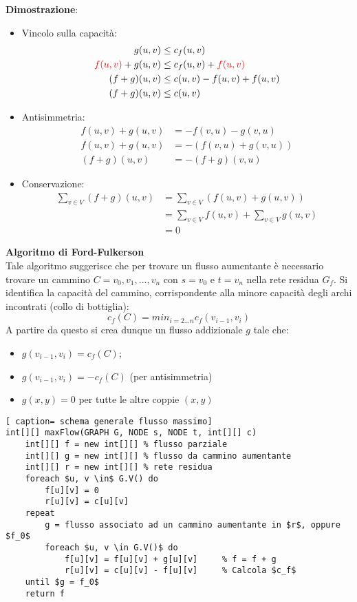 \documentclass[../cheatSheetAlgoritmi.tex]{subfiles}
\begin{document}
\textbf{Dimostrazione}:
\begin{itemize}
	\item Vincolo sulla capacità:
		\begin{align*}
		g(u, v) & \leq c_f(u, v) \\
		\textcolor{red}{f(u, v)} + g(u, v) & \leq c_f(u, v) + \textcolor{red}{f(u, v)} \\
		(f + g)(u, v) & \leq c(u, v) - f(u, v) + f(u, v) \\
		(f + g)(u, v) & \leq c(u, v)
		\end{align*}
	\item Antisimmetria:
		\begin{align*}
		f(u, v) + g(u, v) & = -f(v, u) - g(v, u) \\
		f(u, v) + g(u, v) & = -(f(v, u) + g(v, u)) \\
		(f+g)(u, v) & = - (f + g)(v, u)
		\end{align*}
	\item Conservazione:
		\begin{align*}
		\sum_{v \in V}(f + g)(u, v) & = 	\sum_{v \in V}(f(u, v) + g(u, v)) \\
		& = \sum_{v \in V}f(u, v) +  \sum_{v \in V}g(u, v)\\
		& = 0
		\end{align*}
\end{itemize}
\textbf{Algoritmo di Ford-Fulkerson} \\
Tale algoritmo suggerisce che per trovare un flusso aumentante è necessario trovare un cammino $C = v_0, v_1, ..., v_n$ con $s = v_0$ e $t = v_n$ nella rete residua $G_f$.
Si identifica la capacità del cammino, corrispondente alla minore capacità degli archi incontrati (collo di bottiglia):
\begin{equation*}
  	c_f(C) = min_{i = 2...n} c_f(v_{i-1}, v_i)
\end{equation*}
A partire da questo si crea dunque un flusso addizionale $g$ tale che:
\begin{itemize}
	\item $g(v_{i-1}, v_i) = c_f(C)$;
	\item $g(v_{i-1}, v_i) = - c_f(C)$ (per antisimmetria)
	\item $g(x, y) = 0$  per tutte le altre coppie $(x, y)$
\end{itemize}
 \begin{lstlisting}[ caption= schema generale flusso massimo]
int[][] maxFlow(GRAPH G, NODE s, NODE t, int[][] c)
	int[][] f = new int[][]	% flusso parziale
	int[][] g = new int[][] % flusso da cammino aumentante
	int[][] r = new int[][] % rete residua
	foreach $u, v \in$ G.V() do
		f[u][v] = 0
		r[u][v] = c[u][v]
	repeat
		g = flusso associato ad un cammino aumentante in $r$, oppure $f_0$
		foreach $u, v \in G.V()$ do
			f[u][v] = f[u][v] + g[u][v] 	% f = f + g
			r[u][v] = c[u][v] - f[u][v] 	% Calcola $c_f$
	until $g = f_0$
	return f
\end{lstlisting}
\end{document}
